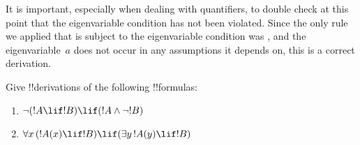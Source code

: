 \documentclass[../../../include/open-logic-section]{subfiles}
\begin{document}
\begin{ex}
It is important, especially when dealing with quantifiers, to double
check at this point that the eigenvariable condition has not been
violated. Since the only rule we applied that is subject to the
eigenvariable condition was \Elim{\exists}, and the eigenvariable~$a$
does not occur in any assumptions it depends on, this is a
correct derivation.
\end{ex}

\begin{prob}
Give !!{derivation}s of the following !!{formula}s:
\begin{enumerate}
\item $\lnot(!A \lif !B) \lif (!A \land \lnot !B)$
\item $\lforall[x][(!A(x) \lif !B)] \lif (\lexists[y][!A(y)] \lif !B)$
\end{enumerate}
\end{prob}
\end{document}

